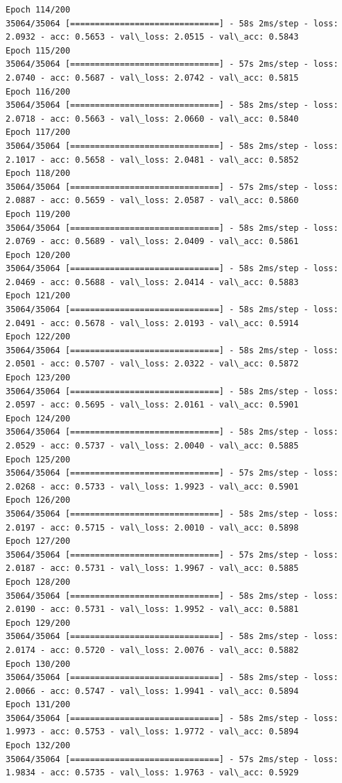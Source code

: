 \documentclass[11pt]{article}
\begin{document}
\begin{Verbatim}[commandchars=\\\{\}]
Epoch 114/200
35064/35064 [==============================] - 58s 2ms/step - loss: 2.0932 - acc: 0.5653 - val\_loss: 2.0515 - val\_acc: 0.5843
Epoch 115/200
35064/35064 [==============================] - 57s 2ms/step - loss: 2.0740 - acc: 0.5687 - val\_loss: 2.0742 - val\_acc: 0.5815
Epoch 116/200
35064/35064 [==============================] - 58s 2ms/step - loss: 2.0718 - acc: 0.5663 - val\_loss: 2.0660 - val\_acc: 0.5840
Epoch 117/200
35064/35064 [==============================] - 58s 2ms/step - loss: 2.1017 - acc: 0.5658 - val\_loss: 2.0481 - val\_acc: 0.5852
Epoch 118/200
35064/35064 [==============================] - 57s 2ms/step - loss: 2.0887 - acc: 0.5659 - val\_loss: 2.0587 - val\_acc: 0.5860
Epoch 119/200
35064/35064 [==============================] - 58s 2ms/step - loss: 2.0769 - acc: 0.5689 - val\_loss: 2.0409 - val\_acc: 0.5861
Epoch 120/200
35064/35064 [==============================] - 58s 2ms/step - loss: 2.0469 - acc: 0.5688 - val\_loss: 2.0414 - val\_acc: 0.5883
Epoch 121/200
35064/35064 [==============================] - 58s 2ms/step - loss: 2.0491 - acc: 0.5678 - val\_loss: 2.0193 - val\_acc: 0.5914
Epoch 122/200
35064/35064 [==============================] - 58s 2ms/step - loss: 2.0501 - acc: 0.5707 - val\_loss: 2.0322 - val\_acc: 0.5872
Epoch 123/200
35064/35064 [==============================] - 58s 2ms/step - loss: 2.0597 - acc: 0.5695 - val\_loss: 2.0161 - val\_acc: 0.5901
Epoch 124/200
35064/35064 [==============================] - 58s 2ms/step - loss: 2.0529 - acc: 0.5737 - val\_loss: 2.0040 - val\_acc: 0.5885
Epoch 125/200
35064/35064 [==============================] - 57s 2ms/step - loss: 2.0268 - acc: 0.5733 - val\_loss: 1.9923 - val\_acc: 0.5901
Epoch 126/200
35064/35064 [==============================] - 58s 2ms/step - loss: 2.0197 - acc: 0.5715 - val\_loss: 2.0010 - val\_acc: 0.5898
Epoch 127/200
35064/35064 [==============================] - 57s 2ms/step - loss: 2.0187 - acc: 0.5731 - val\_loss: 1.9967 - val\_acc: 0.5885
Epoch 128/200
35064/35064 [==============================] - 58s 2ms/step - loss: 2.0190 - acc: 0.5731 - val\_loss: 1.9952 - val\_acc: 0.5881
Epoch 129/200
35064/35064 [==============================] - 58s 2ms/step - loss: 2.0174 - acc: 0.5720 - val\_loss: 2.0076 - val\_acc: 0.5882
Epoch 130/200
35064/35064 [==============================] - 58s 2ms/step - loss: 2.0066 - acc: 0.5747 - val\_loss: 1.9941 - val\_acc: 0.5894
Epoch 131/200
35064/35064 [==============================] - 58s 2ms/step - loss: 1.9973 - acc: 0.5753 - val\_loss: 1.9772 - val\_acc: 0.5894
Epoch 132/200
35064/35064 [==============================] - 57s 2ms/step - loss: 1.9834 - acc: 0.5735 - val\_loss: 1.9763 - val\_acc: 0.5929

\end{Verbatim}
\end{document}
